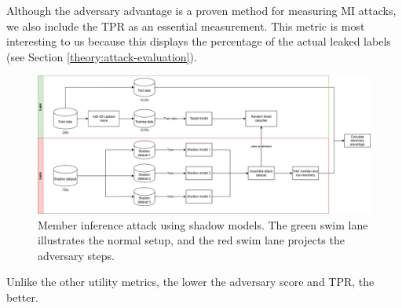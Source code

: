 \begin{enumerate}
        Although the adversary advantage is a proven method for measuring MI attacks, we also include the TPR as an essential measurement.
        This metric is most interesting to us because this displays the percentage of the actual leaked labels (see Section \ref{theory:attack-evaluation}).
        \begin{figure}[H]
          \includegraphics[width=1\textwidth]{Method/images/MI-setup.png}
          \caption{Member inference attack using shadow models. The green swim lane illustrates the normal setup, and the red swim lane projects the adversary steps.}
          \label{figure:mi-attack}
        \end{figure}
        Unlike the other utility metrics, the lower the adversary score and TPR, the better.
\end{enumerate}
%

